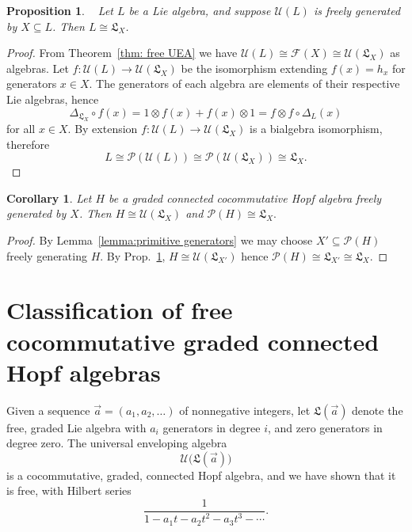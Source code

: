 \documentclass[11pt]{amsart}
\newtheorem{proposition}[theorem]{Proposition}
\newtheorem{corollary}[theorem]{Corollary}
\theoremstyle{definition}
\numberwithin{equation}{section}
\begin{document}
\begin{proposition}~\cite[Prop. 2.4]{F23}
\label{prop:free primitives}
    Let $L$ be a Lie algebra, and suppose $\mathcal{U}(L)$ is freely generated by $X\subseteq L$. Then $L\cong \mathfrak{L}_X$.
\end{proposition}

\begin{proof}
   From Theorem~\ref{thm: free UEA} we have $\mathcal{U}(L) \cong \mathcal{F}(X) \cong \mathcal{U}(\mathfrak{L}_X)$ as algebras. Let $f:\mathcal{U}(L) \to \mathcal{U}(\mathfrak{L}_X)$ be the isomorphism extending $f(x)=h_x$ for generators $x \in X$. The generators of each algebra are elements of their respective Lie algebras, hence 
    \[
    \Delta_{\mathfrak{L}_X} \circ f(x)=1 \otimes f(x) + f(x) \otimes 1 = f \otimes f \circ \Delta_L(x) 
    \]
    for all $x \in X$. By extension $f:\mathcal{U}(L) \to \mathcal{U}(\mathfrak{L}_X)$ is a bialgebra isomorphism, therefore
    \[
    L \cong \mathcal{P}(\mathcal{U}(L)) \cong \mathcal{P}(\mathcal{U}(\mathfrak{L}_X)) \cong \mathfrak{L}_X.
    \]
\end{proof}

\begin{corollary}
    Let $H$ be a graded connected cocommutative Hopf algebra freely generated by $X$. Then $H \cong \mathcal{U}(\mathfrak{L}_X)$ and $\mathcal{P}(H)\cong \mathfrak{L}_X.$
\label{cor: free hopf primitives}
\end{corollary}
\begin{proof}
    By Lemma~\ref{lemma:primitive generators} we may choose $X'\subseteq \mathcal{P}(H)$ freely generating $H$. By Prop.~\ref{prop:free primitives}, $H\cong \mathcal{U}(\mathfrak{L}_{X'})$ hence $\mathcal{P}(H)\cong \mathfrak{L}_{X'}\cong \mathfrak{L}_X.$
\end{proof}

\section{Classification of free cocommutative graded connected Hopf algebras} 

Given a sequence $\vec{a} = (a_{1}, a_{2}, \ldots)$ of nonnegative integers, let $\mathfrak{L}(\vec{a})$ denote the free, graded Lie algebra with $a_{i}$ generators in degree $i$, and zero generators in degree zero.  The universal enveloping algebra
\[
\mathcal{U}\big(\mathfrak{L}(\vec{a})\big)
\]
is a cocommutative, graded, connected Hopf algebra, and we have shown that it is free, with Hilbert series
\[
\frac{1}{1 - a_{1}t - a_{2}t^{2} - a_{3}t^{3} - \cdots}.
\]
\end{document}

